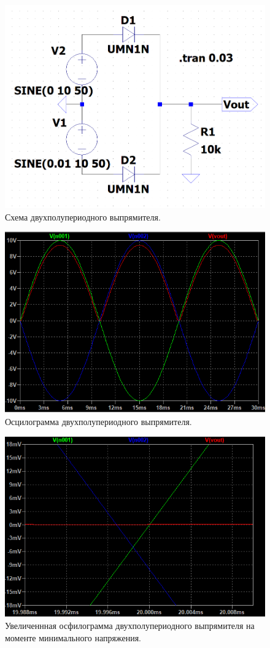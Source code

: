 \begin{figure}[htbp]
    \centering
    \includegraphics[width=0.6\linewidth]{figs/схема_двухполупериодного_выпрямителя.png}
    \caption{Схема двухполупериодного выпрямителя.}
    \label{fig:схемадвухполупериодноговыпрямителя}
\end{figure}

\begin{figure}[htbp]
    \centering
    \includegraphics[width=0.8\linewidth]{figs/осц_двухполупериодного_выпрямителя.png}
    \caption{Осцилограмма двухполупериодного выпрямителя.}
    \label{fig:осцдвухполупериодноговыпрямителя}
\end{figure}

\begin{figure}[htbp]
    \centering
    \includegraphics[width=0.8\linewidth]{figs/момент_мин_напряжения_на_диоде.png}
    \caption{Увеличеннная осфилограмма двухполупериодного выпрямителя на моменте минимального напряжения.}
    \label{fig:миннапряжениевыхода}
\end{figure}

